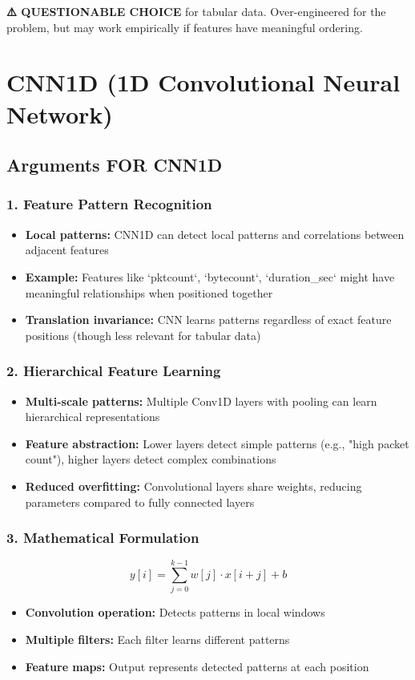 \documentclass[12pt]{article}
\begin{document}
\textbf{⚠️ QUESTIONABLE CHOICE} for tabular data. Over-engineered for the problem, but may work empirically if features have meaningful ordering.

\section{CNN1D (1D Convolutional Neural Network)}

\subsection{Arguments FOR CNN1D}

\subsubsection{1. Feature Pattern Recognition}
\begin{itemize}
    \item \textbf{Local patterns:} CNN1D can detect local patterns and correlations between adjacent features
    \item \textbf{Example:} Features like `pktcount`, `bytecount`, `duration_sec` might have meaningful relationships when positioned together
    \item \textbf{Translation invariance:} CNN learns patterns regardless of exact feature positions (though less relevant for tabular data)
\end{itemize}

\subsubsection{2. Hierarchical Feature Learning}
\begin{itemize}
    \item \textbf{Multi-scale patterns:} Multiple Conv1D layers with pooling can learn hierarchical representations
    \item \textbf{Feature abstraction:} Lower layers detect simple patterns (e.g., "high packet count"), higher layers detect complex combinations
    \item \textbf{Reduced overfitting:} Convolutional layers share weights, reducing parameters compared to fully connected layers
\end{itemize}

\subsubsection{3. Mathematical Formulation}
\[
y[i] = \sum_{j=0}^{k-1} w[j] \cdot x[i+j] + b
\]
\begin{itemize}
    \item \textbf{Convolution operation:} Detects patterns in local windows
    \item \textbf{Multiple filters:} Each filter learns different patterns
    \item \textbf{Feature maps:} Output represents detected patterns at each position
\end{itemize}
\end{document}
